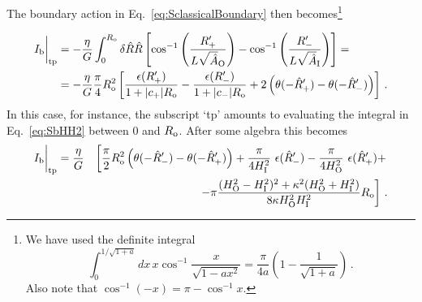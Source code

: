 \documentclass[11pt,a4paper]{article}
\begin{document}
\noindent The boundary action in Eq.~\eqref{eq:SclassicalBoundary} then becomes\footnote{We have used the definite
integral
\begin{equation}
\int_{0}^{1/\sqrt{1+a}}dx \, x\cos^{-1}\frac{x}{\sqrt{1-ax^{2}}}=\frac{\pi}{4a}\left(1-\frac{1}{\sqrt{1+a}}\right) \,.
\end{equation}
Also note that $\cos^{-1}(-x)=\pi-\cos^{-1}x$.\label{fn:DefInt}}

\begin{align}
I_{{\rm b}}\bigg|_{\rm tp} & = -\frac{\eta}{G}\int_{0}^{R_{\rm o}}\delta\hat{R}\hat{R}\left[
\cos^{-1}\left(\frac{R'_{+}}{L\sqrt{\hat{A}}_{{\rm
O}}}\right)-\cos^{-1}\left(\frac{R'_{-}}{L\sqrt{\hat{A}}_{{\rm
I}}}\right)\right] =  \label{eq:SbHH}\\
 & = -\frac{\eta}{G}\frac{\pi}{4}R_{\rm o}^{2}\left[\frac{\epsilon(R_{+}')}{1+|c_{+}|R_{\rm o}}-\frac{\epsilon(R_{-}')}{1+|c_{-}|R_{\rm o}}+2\left(\theta(-\hat{R}_{+}')-\theta(-\hat{R}_{-}')\right)\right] \,.\label{eq:SbHH2}
\end{align} 
In this case, for instance, the subscript `tp' amounts to evaluating the integral in Eq.~\eqref{eq:SbHH2} between 0 and $R_{\rm o}$. After some algebra this becomes 
\begin{eqnarray}\notag
I_{{\rm b}}\bigg|_{\rm tp} = \frac{\eta}{G} &&\left[\frac{\pi}{2}R_{\rm o}^{2} \left(\theta(-\hat R^{\prime}_{-})-\theta(-\hat R^{\prime}_{+})\right)+\frac{\pi}{4H_{\rm I}^{2}}\ \epsilon(\hat R^{\prime}_{-})-\frac{\pi}{4H_{\rm O}^{2}}\ \epsilon(\hat R^{\prime}_{+}) + \right. \\
&& \,\,\, \left.- \pi \frac{(H_{\rm O}^{2}-H_{\rm I}^{2})^{2}+\kappa^{2}(H_{\rm O}^{2}+H_{\rm I}^{2})}{8\kappa H_{\rm O}^{2} H_{\rm I}^{2}} R_{\rm o} \right] \,. 
\label{eq:wall} 
\end{eqnarray}
  
\end{document}
